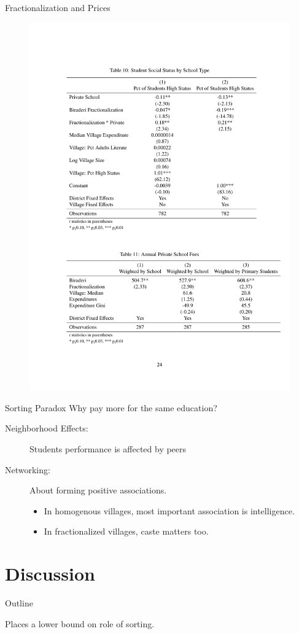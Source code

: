 \documentclass[handout]{beamer}
\begin{document}
\begin{frame}{Fractionalization and Prices}
	\begin{figure}[htb]
		\begin{center}
		\includegraphics[scale=0.6]{tables/prices.pdf}
		\end{center}
	\end{figure}
\end{frame}

\begin{frame}{Sorting Paradox}
Why pay more for the same education?
\pause
\begin{description}
	\item [Neighborhood Effects:] Students performance is affected by peers
	\pause
	\item [Networking:] About forming positive associations. 
	\begin{itemize}
		\item In homogenous villages, most important association is intelligence.
		\item In fractionalized villages, caste matters too. 
	\end{itemize}
\end{description}
\end{frame}


\section{Discussion}\label{}
\begin{frame}{Outline}
	\tableofcontents[current]
\end{frame}


\begin{frame}{}
	Places a lower bound on role of sorting. 
\end{frame}
\end{document}
